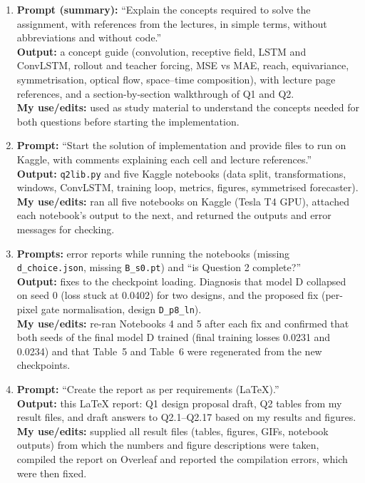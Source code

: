 \documentclass[11pt]{article}
\begin{document}
\begin{enumerate}
\item \textbf{Prompt (summary):} ``Explain the concepts required to solve the assignment, with references from the lectures, in simple terms, without abbreviations and without code.''\\
\textbf{Output:} a concept guide (convolution, receptive field, LSTM and ConvLSTM, rollout and teacher forcing, MSE vs MAE, reach, equivariance, symmetrisation, optical flow, space--time composition), with lecture page references, and a section-by-section walkthrough of Q1 and Q2.\\
\textbf{My use/edits:} used as study material to understand the concepts needed for both questions before starting the implementation.

\item \textbf{Prompt:} ``Start the solution of implementation and provide files to run on Kaggle, with comments explaining each cell and lecture references.''\\
\textbf{Output:} \texttt{q2lib.py} and five Kaggle notebooks (data split, transformations, windows, ConvLSTM, training loop, metrics, figures, symmetrised forecaster).\\
\textbf{My use/edits:} ran all five notebooks on Kaggle (Tesla T4 GPU), attached each notebook's output to the next, and returned the outputs and error messages for checking.

\item \textbf{Prompts:} error reports while running the notebooks (missing \texttt{d\_choice.json}, missing \texttt{B\_s0.pt}) and ``is Question 2 complete?''\\
\textbf{Output:} fixes to the checkpoint loading. Diagnosis that model D collapsed on seed 0 (loss stuck at 0.0402) for two designs, and the proposed fix (per-pixel gate normalisation, design \texttt{D\_p8\_ln}).\\
\textbf{My use/edits:} re-ran Notebooks 4 and 5 after each fix and confirmed that both seeds of the final model D trained (final training losses 0.0231 and 0.0234) and that Table~5 and Table~6 were regenerated from the new checkpoints.

\item \textbf{Prompt:} ``Create the report as per requirements (LaTeX).''\\
\textbf{Output:} this LaTeX report: Q1 design proposal draft, Q2 tables from my result files, and draft answers to Q2.1--Q2.17 based on my results and figures.\\
\textbf{My use/edits:} supplied all result files (tables, figures, GIFs, notebook outputs) from which the numbers and figure descriptions were taken, compiled the report on Overleaf and reported the compilation errors, which were then fixed.
\end{enumerate}
\end{document}
